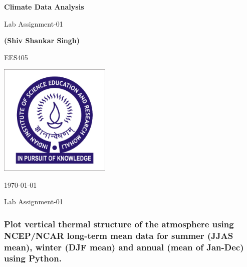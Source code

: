 \documentclass[10pt, a4paper]{article}
\newcommand\course{EES405}                            %
\newcommand\hwnumber{Lab Assignment-01}                                 %
\newcommand\Information{(Shiv Shankar Singh)}%
\begin{document}
\begin{titlepage}
    \begin{center}
        \vspace*{3cm}
            
        \Huge
        \textbf{Climate Data Analysis}
            
        \vspace{1cm}
        \huge
        \hwnumber
            
        \vspace{1.5cm}
        \Large
            
        \textbf{\Information}                      %
        
            
        \vfill
        
        \course
            
        \vspace{1cm}
            
        \includegraphics[width=0.4\textwidth]{iisermlogo.jpg}
        \\
        
        \Large
        
        \today
            
    \end{center}
\end{titlepage}

\newpage
Lab Assignment-01
\subsubsection*{Plot vertical thermal structure of the atmosphere using NCEP/NCAR long-term mean data for summer (JJAS mean), winter (DJF mean) and annual (mean of Jan-Dec) using Python.}
\end{document}
